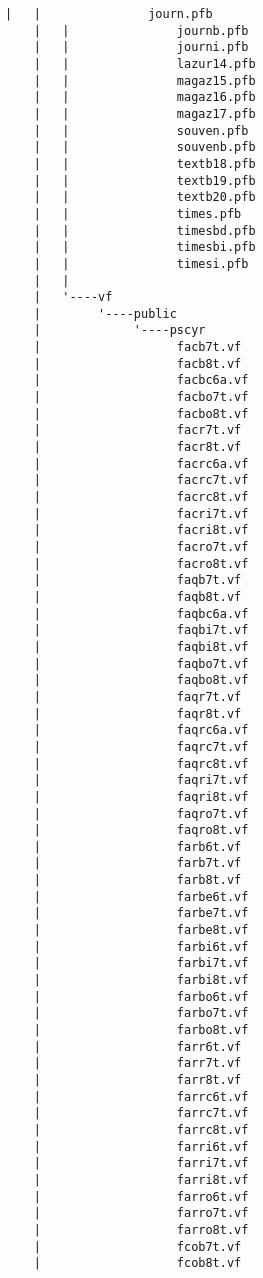 \begin{lstlisting}[frame=tb, extendedchars=false, breaklines=false, basicstyle=\footnotesize\upshape ,columns=flexible ,keepspaces=true , lineskip={-7.0pt} ]
    |   |               journ.pfb
    |   |               journb.pfb
    |   |               journi.pfb
    |   |               lazur14.pfb
    |   |               magaz15.pfb
    |   |               magaz16.pfb
    |   |               magaz17.pfb
    |   |               souven.pfb
    |   |               souvenb.pfb
    |   |               textb18.pfb
    |   |               textb19.pfb
    |   |               textb20.pfb
    |   |               times.pfb
    |   |               timesbd.pfb
    |   |               timesbi.pfb
    |   |               timesi.pfb
    |   |               
    |   '----vf
    |        '----public
    |             '----pscyr
    |                   facb7t.vf
    |                   facb8t.vf
    |                   facbc6a.vf
    |                   facbo7t.vf
    |                   facbo8t.vf
    |                   facr7t.vf
    |                   facr8t.vf
    |                   facrc6a.vf
    |                   facrc7t.vf
    |                   facrc8t.vf
    |                   facri7t.vf
    |                   facri8t.vf
    |                   facro7t.vf
    |                   facro8t.vf
    |                   faqb7t.vf
    |                   faqb8t.vf
    |                   faqbc6a.vf
    |                   faqbi7t.vf
    |                   faqbi8t.vf
    |                   faqbo7t.vf
    |                   faqbo8t.vf
    |                   faqr7t.vf
    |                   faqr8t.vf
    |                   faqrc6a.vf
    |                   faqrc7t.vf
    |                   faqrc8t.vf
    |                   faqri7t.vf
    |                   faqri8t.vf
    |                   faqro7t.vf
    |                   faqro8t.vf
    |                   farb6t.vf
    |                   farb7t.vf
    |                   farb8t.vf
    |                   farbe6t.vf
    |                   farbe7t.vf
    |                   farbe8t.vf
    |                   farbi6t.vf
    |                   farbi7t.vf
    |                   farbi8t.vf
    |                   farbo6t.vf
    |                   farbo7t.vf
    |                   farbo8t.vf
    |                   farr6t.vf
    |                   farr7t.vf
    |                   farr8t.vf
    |                   farrc6t.vf
    |                   farrc7t.vf
    |                   farrc8t.vf
    |                   farri6t.vf
    |                   farri7t.vf
    |                   farri8t.vf
    |                   farro6t.vf
    |                   farro7t.vf
    |                   farro8t.vf
    |                   fcob7t.vf
    |                   fcob8t.vf

\end{lstlisting}
